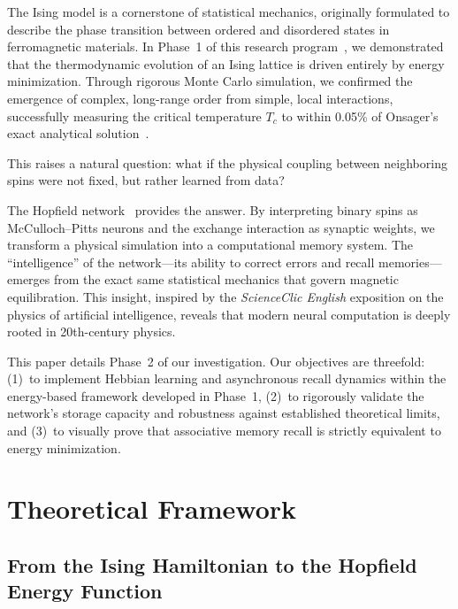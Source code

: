 \documentclass[11pt,a4paper,twocolumn]{article}
\begin{document}
The Ising model is a cornerstone of statistical mechanics, originally
formulated to describe the phase transition between ordered and disordered
states in ferromagnetic materials. In Phase~1 of this research
program~\cite{gewily2025phase1}, we demonstrated that the thermodynamic
evolution of an Ising lattice is driven entirely by energy minimization.
Through rigorous Monte Carlo simulation, we confirmed the emergence of
complex, long-range order from simple, local interactions, successfully
measuring the critical temperature $T_c$ to within 0.05\% of Onsager's exact
analytical solution~\cite{onsager1944}.

This raises a natural question: what if the physical coupling between
neighboring spins were not fixed, but rather learned from data?

The Hopfield network~\cite{hopfield1982} provides the answer. By interpreting
binary spins as McCulloch--Pitts neurons and the exchange interaction as
synaptic weights, we transform a physical simulation into a computational
memory system. The ``intelligence'' of the network---its ability to correct
errors and recall memories---emerges from the exact same statistical mechanics
that govern magnetic equilibration. This insight, inspired by the
\emph{ScienceClic English} exposition on the physics of artificial
intelligence, reveals that modern neural computation is deeply rooted in
20th-century physics.

This paper details Phase~2 of our investigation. Our objectives are
threefold: (1)~to implement Hebbian learning and asynchronous recall dynamics
within the energy-based framework developed in Phase~1, (2)~to rigorously
validate the network's storage capacity and robustness against established
theoretical limits, and (3)~to visually prove that associative memory recall
is strictly equivalent to energy minimization.

\section{Theoretical Framework}
\label{sec:theory}

\subsection{From the Ising Hamiltonian to the Hopfield Energy Function}
\label{sec:ising_to_hopfield}
\end{document}
